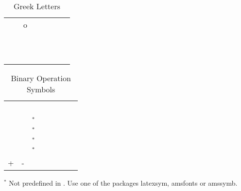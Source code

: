 \begin{appendices}
%
\begin{table}
\caption{Greek Letters}\label{tab:greek}
\vspace{1ex}
\begin{tabular}{*8l}
\X\alpha	&\X\theta	&\X o		&\X\tau 	\\
\X\beta 	&\X\vartheta	&\X\pi		&\X\upsilon	\\
\X\gamma	&\X\iota	&\X\varpi	&\X\phi 	\\
\X\delta	&\X\kappa	&\X\rho 	&\X\varphi	\\
\X\epsilon	&\X\lambda	&\X\varrho	&\X\chi 	\\
\X\varepsilon	&\X\mu		&\X\sigma	&\X\psi 	\\
\X\zeta 	&\X\nu		&\X\varsigma	&\X\omega	\\
\X\eta		&\X\xi						\\
								\\
\X\Gamma	&\X\Lambda	&\X\Sigma	&\X\Psi 	\\
\X\Delta	&\X\Xi		&\X\Upsilon	&\X\Omega	\\
\X\Theta	&\X\Pi		&\X\Phi
\end{tabular}
\end{table}

\begin{table}
\caption{Binary Operation Symbols}\label{tab:bin}
\vspace{1ex}
\begin{tabular}{*8l}
\X\pm		&\X\cap 	&\X\diamond		&\X\oplus     \\
\X\mp		&\X\cup 	&\X\bigtriangleup	&\X\ominus    \\
\X\times	&\X\uplus	&\X\bigtriangledown	&\X\otimes    \\
\X\div		&\X\sqcap	&\X\triangleleft	&\X\oslash    \\
\X\ast		&\X\sqcup	&\X\triangleright	&\X\odot      \\
\X\star 	&\X\vee 	&\X\lhd$^*$		&\X\bigcirc   \\
\X\circ 	&\X\wedge	&\X\rhd$^*$		&\X\dagger    \\
\X\bullet	&\X\setminus	&\X\unlhd$^*$		&\X\ddagger   \\
\X\cdot 	&\X\wr		&\X\unrhd$^*$		&\X\amalg     \\
\X+		&\X-
\end{tabular}

$^*$ Not predefined in \LaTeXe.
     Use one of the packages  \textsf{latexsym}, \textsf{amsfonts} or
     \textsf{amssymb}.

\end{table}



\end{appendices}
